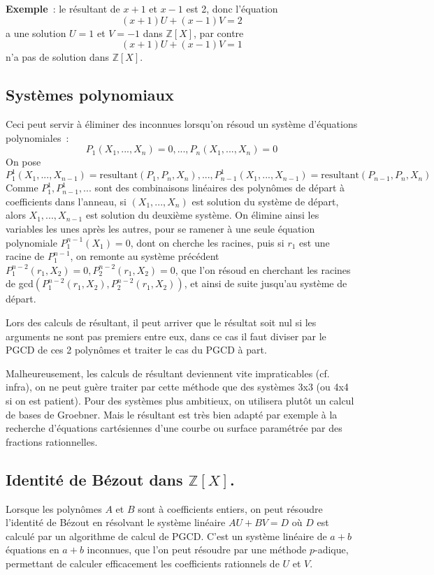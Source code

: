 \documentclass[a4paper,11pt]{book}
\begin{document}
\begin{giacjshere}
{\bf Exemple}~: le r\'esultant de $x+1$ et $x-1$ est 2, donc l'\'equation
$$ (x+1)U+(x-1)V=2$$ a une solution $U=1$ et $V=-1$ dans $\mathbb{Z}[X]$,
par contre $$ (x+1)U+(x-1)V=1$$ n'a pas de solution dans $\mathbb{Z}[X]$.

\subsection{Syst\`emes polynomiaux}
Ceci peut servir \`a \'eliminer des inconnues lorsqu'on r\'esoud un
syst\`eme d'\'equations polynomiales~:
$$ P_1(X_1,...,X_n)=0, ..., P_n(X_1,...,X_n)=0$$
On pose 
$$P^1_1(X_1,...,X_{n-1})=\mbox{resultant}(P_1,P_n,X_n), ..., 
P^1_{n-1}(X_1,...,X_{n-1})=\mbox{resultant}(P_{n-1},P_n,X_n)
$$
Comme $P^1_1, P^1_{n-1}, ...$ sont des combinaisons lin\'eaires des
polyn\^omes de d\'epart \`a coefficients dans l'anneau, si
$(X_1,...,X_n)$
est solution du syst\`eme de d\'epart, alors $X_1,...,X_{n-1}$
est solution du deuxi\`eme syst\`eme.
On \'elimine ainsi les variables les unes apr\`es les autres,
pour se ramener \`a une seule \'equation polynomiale $P^{n-1}_1(X_1)=0$, dont on
cherche les racines, puis si $r_1$ est une racine de $P^{n-1}_1$, on
remonte au syst\`eme pr\'ec\'edent $P^{n-2}_1(r_1,X_2)=0,
P^{n-2}_2(r_1,X_2)=0$, que l'on r\'esoud en cherchant
les racines de gcd$(P^{n-2}_1(r_1,X_2),P^{n-2}_2(r_1,X_2))$, et ainsi
de suite jusqu'au syst\`eme de d\'epart.

Lors des calculs de r\'esultant, il peut arriver que le r\'esultat
soit nul si les arguments ne sont pas premiers entre eux, dans
ce cas il faut diviser par le PGCD de ces 2 polyn\^omes et traiter le cas
du PGCD \`a part.

Malheureusement, les calculs de r\'esultant deviennent vite
impraticables (cf. infra), on ne peut gu\`ere traiter par cette m\'ethode
que des syst\`emes 3x3 (ou 4x4 si on est patient). Pour
des syst\`emes plus ambitieux, on utilisera plut\^ot un
calcul de bases de Groebner. Mais le r\'esultant est tr\`es bien
adapt\'e par exemple \`a la recherche d'\'equations cart\'esiennes
d'une courbe ou surface param\'etr\'ee par des fractions rationnelles.

\subsection{Identit\'e de B\'ezout dans $\mathbb{Z}[X]$.}
Lorsque les polyn\^omes $A$ et $B$ sont \`a coefficients entiers,
on peut r\'esoudre l'identit\'e de B\'ezout en r\'esolvant le
syst\`eme lin\'eaire $AU+BV=D$ o\`u $D$ est calcul\'e par
un algorithme de calcul de PGCD. C'est un syst\`eme lin\'eaire
de $a+b$ \'equations en $a+b$ inconnues, que l'on peut r\'esoudre
par une m\'ethode $p$-adique, permettant de calculer efficacement
les coefficients rationnels de $U$ et $V$.


\end{giacjshere}
\end{document}
